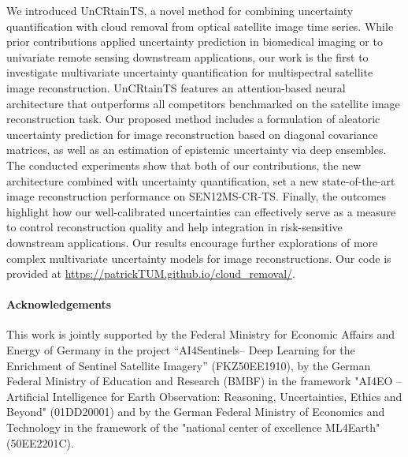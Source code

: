 \documentclass[10pt,twocolumn,letterpaper]{article}
\begin{document}
We introduced UnCRtainTS, a novel method for combining uncertainty quantification with cloud removal from optical satellite image time series. While prior contributions applied uncertainty prediction in biomedical imaging or to univariate remote sensing downstream applications, our work is the first to investigate multivariate uncertainty quantification for multispectral satellite image reconstruction. UnCRtainTS features an attention-based neural architecture that outperforms all competitors benchmarked on the satellite image reconstruction task. Our proposed method includes a formulation of aleatoric uncertainty prediction for image reconstruction based on diagonal covariance matrices, as well as an estimation of epistemic uncertainty via deep ensembles. 
The conducted experiments show that both of our contributions, the new architecture combined with uncertainty quantification, set a new state-of-the-art image reconstruction performance on SEN12MS-CR-TS. Finally, the outcomes highlight how our well-calibrated uncertainties can effectively serve as a measure to control reconstruction quality and help integration in risk-sensitive downstream applications.
Our results encourage further explorations of more complex multivariate uncertainty models for image reconstructions. 
Our code is provided at \small{\url{https://patrickTUM.github.io/cloud_removal/}}.

\noindent
\paragraph{\bf Acknowledgements} \small{This work is jointly supported by the Federal Ministry for Economic Affairs and Energy of Germany in the project “AI4Sentinels– Deep Learning for the Enrichment of Sentinel Satellite Imagery” (FKZ50EE1910), by the German Federal Ministry of Education and Research (BMBF) in the framework "AI4EO -- Artificial Intelligence for Earth Observation: Reasoning, Uncertainties, Ethics and Beyond" (01DD20001) and by the German Federal Ministry of Economics and Technology in the framework of the "national center of excellence ML4Earth" (50EE2201C).}

\clearpage


{\small


}
\end{document}
